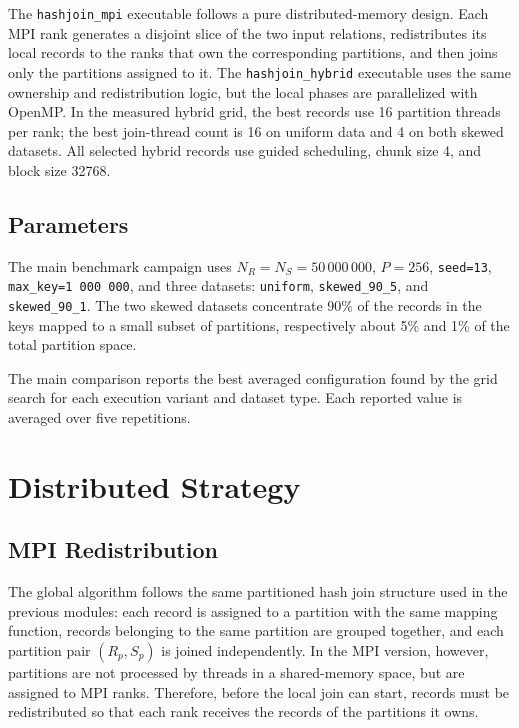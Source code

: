 \documentclass[11pt,a4paper]{article}
\begin{document}
The \texttt{hashjoin\_mpi} executable follows a pure distributed-memory design.  Each MPI rank generates a disjoint slice of the two input relations, redistributes its local records to the ranks that own the corresponding partitions, and then joins only the partitions assigned to it.
The \texttt{hashjoin\_hybrid} executable uses the same ownership and redistribution logic, but the local phases are parallelized with OpenMP.  In the measured hybrid grid, the best records use 16 partition threads per rank; the best join-thread count is 16 on uniform data and 4 on both skewed datasets.  All selected hybrid records use guided scheduling, chunk size 4, and block size 32768.

\subsection{Parameters}

The main benchmark campaign uses \(N_R=N_S=50\,000\,000\), \(P=256\), \texttt{seed=13}, \texttt{max\_key=1\,000\,000}, and three datasets: \texttt{uniform}, \texttt{skewed\_90\_5}, and \texttt{skewed\_90\_1}.  The two skewed datasets concentrate 90\% of the records in the keys mapped to a small subset of partitions, respectively about 5\% and 1\% of the total partition space.

The main comparison reports the best averaged configuration found by the grid search for each execution variant and dataset type. Each reported value is averaged over five repetitions.


\section{Distributed Strategy}

\subsection{MPI Redistribution}

The global algorithm follows the same partitioned hash join structure used in the previous modules: each record is assigned to a partition with the same mapping function, records belonging to the same partition are grouped together, and each partition pair \((R_p,S_p)\) is joined independently. In the MPI version, however, partitions are not processed by threads in a shared-memory space, but are assigned to MPI ranks. Therefore, before the local join can start, records must be redistributed so that each rank receives the records of the partitions it owns.
\end{document}
